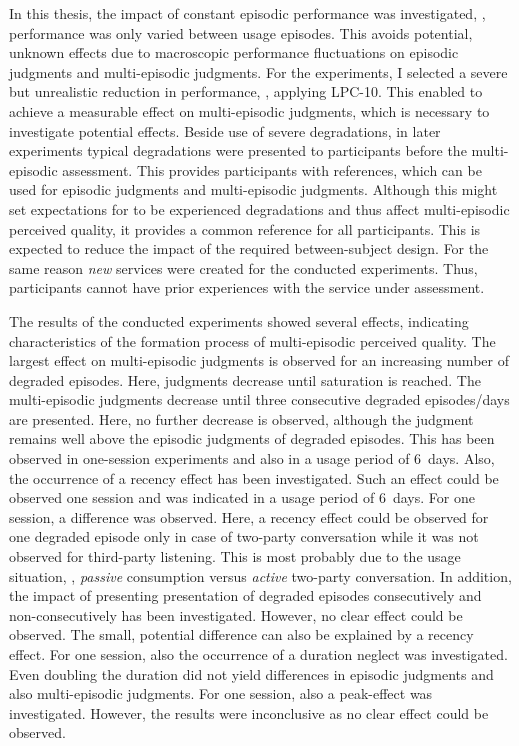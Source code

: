 In this thesis, the impact of constant episodic performance was investigated, \ie, performance was only varied between usage episodes.
This avoids potential, unknown effects due to macroscopic performance fluctuations on episodic judgments and multi-episodic judgments.
For the experiments, I selected a severe but unrealistic reduction in performance, \ie, applying LPC-10.
This enabled to achieve a measurable effect on multi-episodic judgments, which is necessary to investigate potential effects.
Beside use of severe degradations, in later experiments typical degradations were presented to participants before the multi-episodic assessment.
This provides participants with references, which can be used for episodic judgments and multi-episodic judgments.
Although this might set expectations for to be experienced degradations and thus affect multi-episodic perceived quality, it provides a common reference for all participants.
This is expected to reduce the impact of the required between-subject design.
For the same reason \emph{new} services were created for the conducted experiments.
Thus, participants cannot have prior experiences with the service under assessment.

The results of the conducted experiments showed several effects, indicating characteristics of the formation process of multi-episodic perceived quality.
The largest effect on multi-episodic judgments is observed for an increasing number of degraded episodes.
Here, judgments decrease until saturation is reached.
The multi-episodic judgments decrease until three consecutive degraded episodes/days are presented.
Here, no further decrease is observed, although the judgment remains well above the episodic judgments of degraded episodes.
This has been observed in one-session experiments and also in a usage period of 6~days.
Also, the occurrence of a recency effect has been investigated.
Such an effect could be observed one session and was indicated in a usage period of 6~days.
For one session, a difference was observed.
Here, a recency effect could be observed for one degraded episode only in case of two-party conversation while it was not observed for third-party listening.
This is most probably due to the usage situation, \ie, \emph{passive} consumption versus \emph{active} two-party conversation.
In addition, the impact of presenting presentation of degraded episodes consecutively and non-consecutively has been investigated.
However, no clear effect could be observed.
The small, potential difference can also be explained by a recency effect.
For one session, also the occurrence of a duration neglect was investigated.
Even doubling the duration did not yield differences in episodic judgments and also multi-episodic judgments.
For one session, also a peak-effect was investigated.
However, the results were inconclusive as no clear effect could be observed.

